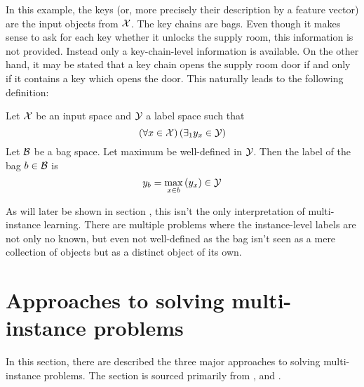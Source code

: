 In this example, the keys (or, more precisely their description by a feature vector) are the input objects from \( \mathcal{X} \). The key chains are bags. Even though it makes sense to ask for each key whether it unlocks the supply room, this information is not provided. Instead only a key-chain-level information is available. On the other hand, it may be stated that a key chain opens the supply room door if and only if it contains a key which opens the door. This naturally leads to the following definition:

\begin{define}
	Let \( \mathcal{X} \) be an input space and \( \mathcal{Y} \) a label space such that
	\[ \left( \forall x \in \mathcal{X} \right) \left( \exists_1 y_x \in \mathcal{Y} \right) \]
	Let \( \mathcal{B} \) be a bag space. Let maximum be well-defined in \( \mathcal{Y} \). Then the label of the bag \( b \in \mathcal{B} \) is
	\[ y_b = \max_{x \in b} \left( y_x \right) \in \mathcal{Y} \]
\end{define}

As will later be shown in section , this isn't the only interpretation of multi-instance learning. There are multiple problems  where the instance-level labels are not only no known, but even not well-defined as the bag isn't seen as a mere collection of objects but as a distinct object of its own.

\section{Approaches to solving multi-instance problems}
In this section, there are described the three major approaches to solving multi-instance problems. The section is sourced primarily from \cite{pevny_using_2016}, \cite{pevny_discriminative_2016} and \cite{amores_multiple_2013}. 
